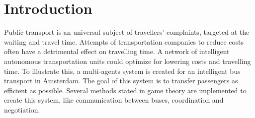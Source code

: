 \section{Introduction}

Public transport is an universal subject of travellers' complaints, targeted at the waiting and travel time. Attempts of transportation companies to reduce costs often have a detrimental effect on travelling time. A network of intelligent autonomous transportation units could optimize for lowering costs and travelling time. To illustrate this, a multi-agents system is created for an intelligent bus transport in Amsterdam. The goal of this system is to transfer passengers as efficient as possible. Several methods stated in game theory \cite{intromultiagentsystems} are implemented to create this system, like communication between buses, coordination and negotiation. 

